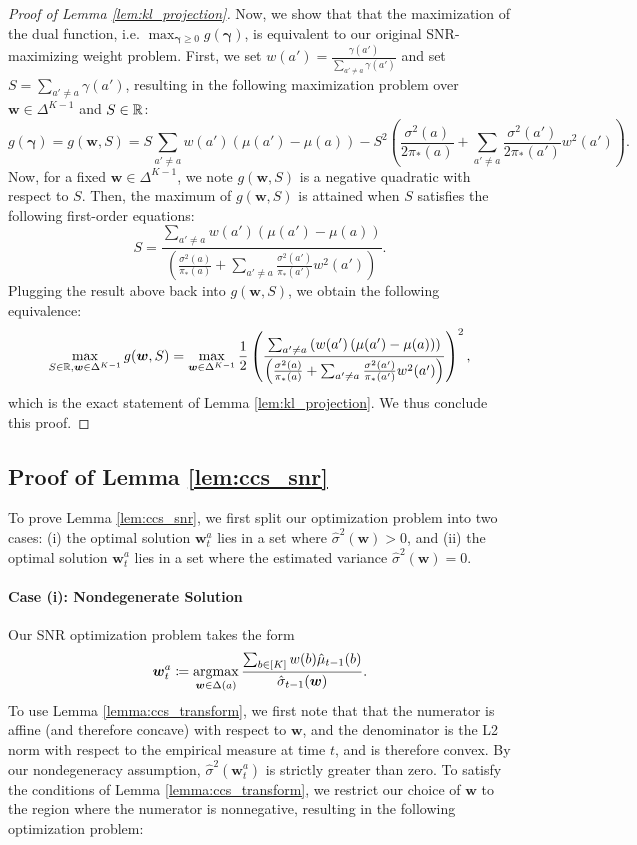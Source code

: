 \documentclass{article}
\begin{document}
\begin{appendices}
\begin{proof}[Proof of Lemma \ref{lem:kl_projection}]
Now, we show that that the maximization of the dual function, i.e. $\max_{\bm\gamma \geq 0} g(\bm\gamma)$, is equivalent to our original SNR-maximizing weight problem. First, we set $w(a') = \frac{\gamma(a')}{\sum_{a' \neq a}\gamma(a')}$ and set $S = \sum_{a' \neq a}\gamma(a')$, resulting in the following maximization problem over $\bm{w} \in \Delta^{K-1}$ and $S \in \mathbb{R}$:
$$
    g(\bm\gamma) = g(\bm{w}, S) = S\sum_{a' \neq a} w(a')(\mu(a') - \mu(a)) - S^2 \left(\frac{\sigma^2(a)}{2\pi_*(a)} + \sum_{a' \neq a}\frac{\sigma^2(a')}{2\pi_*(a')}w^2(a')\right).
$$
Now, for a fixed $\bm{w} \in \Delta^{K-1}$, we note $g(\bm{w}, S)$ is a negative quadratic with respect to $S$. Then, the maximum of $g(\bm{w}, S)$ is attained when $S$ satisfies the following first-order equations:
$$
S = \frac{\sum_{a' \neq a} w(a')\left(\mu(a') - \mu(a)\right)}{\left(\frac{\sigma^2(a)}{\pi_*(a)} + \sum_{a' \neq a}\frac{\sigma^2(a')}{\pi_*(a')}w^2(a')\right)}.
$$
Plugging the result above back into $g(\bm{w}, S)$, we obtain the following equivalence:
$$ 
\max_{S \in \mathbb{R}, \boldsymbol{w} \in \Delta^{K-1}} g(\boldsymbol{w}, S) = \max_{\boldsymbol{w} \in \Delta^{K-1}} \frac{1}{2}\left(\frac{\sum_{a' \neq a} \left(w(a') \left(\mu(a') - \mu(a) \right) \right)}{\left(\frac{\sigma^2(a)}{\pi_*(a)} + \sum_{a' \neq a}\frac{\sigma^2(a')}{\pi_*(a')}w^2(a')\right)}\right)^2,
$$
which is the exact statement of Lemma \ref{lem:kl_projection}. We thus conclude this proof. 
\end{proof}


\subsection{Proof of Lemma \ref{lem:ccs_snr}}

To prove Lemma \ref{lem:ccs_snr}, we first split our optimization problem into two cases: (i) the optimal solution $\bm{w}_t^a$ lies in a set where $\hat\sigma^2(\bm{w}) > 0$, and (ii) the optimal solution $\bm{w}_t^a$ lies in a set where the estimated variance $\hat\sigma^2(\bm{w}) = 0$. 

\paragraph{Case (i): Nondegenerate Solution}
Our SNR optimization problem takes the form
$$
\bm{w}_t^a \coloneqq \argmax_{\bm{w} \in \Delta(a)} \frac{\sum_{b \in [K]} w(b)\hat\mu_{t-1}(b) }{\hat\sigma_{t-1}(\bm{w})}.
$$ 
To use Lemma \ref{lemma:ccs_transform}, we first note that that the numerator is affine (and therefore concave) with respect to $\bm{w}$, and the denominator is the L2 norm with respect to the empirical measure at time $t$, and is therefore convex. By our nondegeneracy assumption, $\hat\sigma^2(\bm{w}_t^a)$ is strictly greater than zero. To satisfy the conditions of Lemma \ref{lemma:ccs_transform}, we restrict our choice of $\bm{w}$ to the region where the numerator is nonnegative, resulting in the following optimization problem:


\end{appendices}
\end{document}
